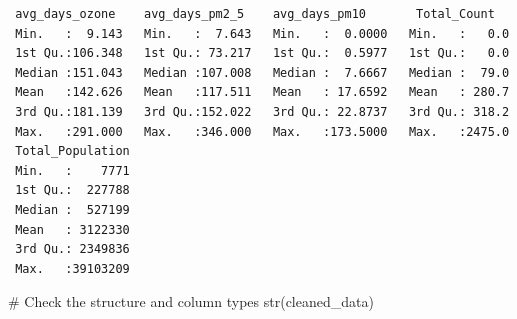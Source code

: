 \documentclass[
  12pt,
]{article}
\newenvironment{Shaded}{\begin{snugshade}}{\end{snugshade}}
\newcommand{\CommentTok}[1]{\textcolor[rgb]{0.37,0.37,0.37}{#1}}
\newcommand{\FunctionTok}[1]{\textcolor[rgb]{0.28,0.35,0.67}{#1}}
\newcommand{\NormalTok}[1]{\textcolor[rgb]{0.00,0.23,0.31}{#1}}
\begin{document}
\begin{verbatim}
 avg_days_ozone    avg_days_pm2_5    avg_days_pm10       Total_Count    
 Min.   :  9.143   Min.   :  7.643   Min.   :  0.0000   Min.   :   0.0  
 1st Qu.:106.348   1st Qu.: 73.217   1st Qu.:  0.5977   1st Qu.:   0.0  
 Median :151.043   Median :107.008   Median :  7.6667   Median :  79.0  
 Mean   :142.626   Mean   :117.511   Mean   : 17.6592   Mean   : 280.7  
 3rd Qu.:181.139   3rd Qu.:152.022   3rd Qu.: 22.8737   3rd Qu.: 318.2  
 Max.   :291.000   Max.   :346.000   Max.   :173.5000   Max.   :2475.0  
 Total_Population  
 Min.   :    7771  
 1st Qu.:  227788  
 Median :  527199  
 Mean   : 3122330  
 3rd Qu.: 2349836  
 Max.   :39103209  
\end{verbatim}

\begin{Shaded}
\begin{Highlighting}[]
\CommentTok{\# Check the structure and column types}
\FunctionTok{str}\NormalTok{(cleaned\_data)}
\end{Highlighting}
\end{Shaded}
\end{document}
